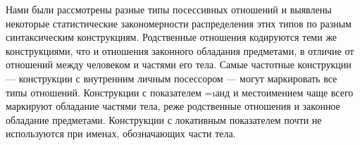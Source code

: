 Нами были рассмотрены разные типы посессивных отношений и выявлены некоторые статистические закономерности распределения этих типов по разным синтаксическим конструкциям. Родственные отношения кодируются теми же конструкциями, что и отношения законного обладания предметами, в отличие от отношений между человеком и частями его тела. Самые частотные конструкции — конструкции с внутренним личным посессором — могут маркировать все типы отношений. Конструкции с показателем =\i{анд} и местоимением чаще всего маркируют обладание частями тела, реже родственные отношения и законное обладание предметами. Конструкции с локативным показателем почти не используются при именах, обозначающих части тела.